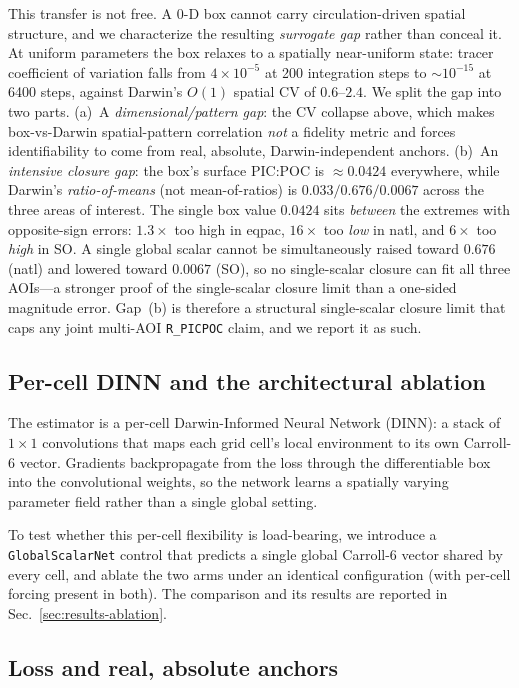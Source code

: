 \documentclass[11pt]{article}
\begin{document}
This transfer is not free. A $0$-D box cannot carry circulation-driven spatial structure, and we characterize the resulting \emph{surrogate gap} rather than conceal it. At uniform parameters the box relaxes to a spatially near-uniform state: tracer coefficient of variation falls from $4\times10^{-5}$ at 200 integration steps to $\sim10^{-15}$ at 6400 steps, against Darwin's $O(1)$ spatial CV of $0.6$--$2.4$. We split the gap into two parts. (a)~A \emph{dimensional/pattern gap}: the CV collapse above, which makes box-vs-Darwin spatial-pattern correlation \emph{not} a fidelity metric and forces identifiability to come from real, absolute, Darwin-independent anchors. (b)~An \emph{intensive closure gap}: the box's surface PIC:POC is $\approx 0.0424$ everywhere, while Darwin's \emph{ratio-of-means} (not mean-of-ratios) is $0.033/0.676/0.0067$ across the three areas of interest. The single box value $0.0424$ sits \emph{between} the extremes with opposite-sign errors: $1.3\times$ too high in eqpac, $16\times$ too \emph{low} in natl, and $6\times$ too \emph{high} in SO. A single global scalar cannot be simultaneously raised toward $0.676$ (natl) and lowered toward $0.0067$ (SO), so no single-scalar closure can fit all three AOIs---a stronger proof of the single-scalar closure limit than a one-sided magnitude error. Gap~(b) is therefore a structural single-scalar closure limit that caps any joint multi-AOI \texttt{R\_PICPOC} claim, and we report it as such.

\subsection{Per-cell DINN and the architectural ablation}

The estimator is a per-cell Darwin-Informed Neural Network (DINN): a stack of $1\times1$ convolutions that maps each grid cell's local environment to its own Carroll-6 vector. Gradients backpropagate from the loss through the differentiable box into the convolutional weights, so the network learns a spatially varying parameter field rather than a single global setting.

To test whether this per-cell flexibility is load-bearing, we introduce a \texttt{GlobalScalarNet} control that predicts a single global Carroll-6 vector shared by every cell, and ablate the two arms under an identical configuration (with per-cell forcing present in both). The comparison and its results are reported in Sec.~\ref{sec:results-ablation}.

\subsection{Loss and real, absolute anchors}
\end{document}
